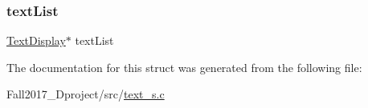 \subsubsection{\texorpdfstring{text\+List}{textList}}
{\footnotesize\ttfamily \hyperlink{text__s_8h_ad683586873c96cc0104ec26d2a21b580}{Text\+Display}$\ast$ text\+List}



The documentation for this struct was generated from the following file\+:\begin{DoxyCompactItemize}
\item 
Fall2017\+\_\+Dproject/src/\hyperlink{text__s_8c}{text\+\_\+s.\+c}\end{DoxyCompactItemize}
